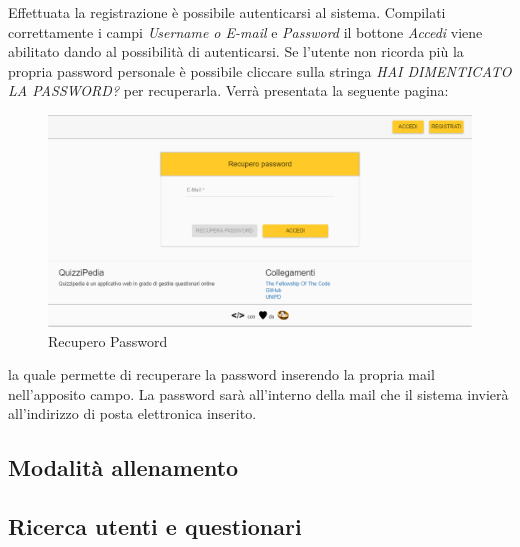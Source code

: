 Effettuata la registrazione è possibile autenticarsi al sistema. Compilati correttamente i campi \textit{Username o E-mail} e \textit{Password} il bottone \textit{Accedi} viene abilitato dando al possibilità di autenticarsi. Se l'utente non ricorda più la propria password personale è possibile cliccare sulla stringa \textit{HAI DIMENTICATO LA PASSWORD?} per recuperarla. Verrà presentata la seguente pagina:

\label{RecuperoPassword}
\begin{figure}[ht]
	\centering
	\includegraphics[scale=0.40]{img/recupero_password.png}
	\caption{Recupero Password}
\end{figure}
\FloatBarrier

la quale permette di recuperare la password inserendo la propria mail nell'apposito campo. La password sarà all'interno della mail che il sistema invierà all'indirizzo di posta elettronica inserito.  

\subsection{Modalità allenamento}
\subsection{Ricerca utenti e questionari}